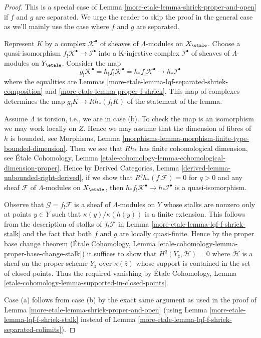 \begin{proof}
This is a special case of Lemma \ref{more-etale-lemma-shriek-proper-and-open}
if $f$ and $g$ are separated. We urge the reader to skip the proof
in the general case
as we'll mainly use the case where $f$ and $g$ are separated.

\medskip\noindent
Represent $K$ by a complex $\mathcal{K}^\bullet$ of sheaves of
$\Lambda$-modules on $X_\etale$. Choose a quasi-isomorphism
$f_!\mathcal{K}^\bullet \to \mathcal{I}^\bullet$ into a K-injective
complex $\mathcal{I}^\bullet$ of sheaves of $\Lambda$-modules on $Y_\etale$.
Consider the map
$$
g_!\mathcal{K}^\bullet =
h_!f_!\mathcal{K}^\bullet =
h_*f_!\mathcal{K}^\bullet
\longrightarrow
h_*\mathcal{I}^\bullet
$$
where the equalities are
Lemmas \ref{more-etale-lemma-lqf-separated-shriek-composition}
and \ref{more-etale-lemma-proper-f-shriek}. This map of complexes determines the map
$g_!K \to Rh_*(f_!K)$ of the statement of the lemma.

\medskip\noindent
Assume $\Lambda$ is torsion, i.e., we are in case (b). To check the map
is an isomorphism we may work locally on $Z$.
Hence we may assume that the dimension of fibres of $h$ is bounded,
see Morphisms, Lemma
\ref{morphisms-lemma-morphism-finite-type-bounded-dimension}.
Then we see that $Rh_*$ has finite cohomological dimension, see
\'Etale Cohomology, Lemma
\ref{etale-cohomology-lemma-cohomological-dimension-proper}.
Hence by Derived Categories, Lemma \ref{derived-lemma-unbounded-right-derived},
if we show that $R^qh_*(f_!\mathcal{F}) = 0$ for $q > 0$
and any sheaf $\mathcal{F}$ of $\Lambda$-modules on $X_\etale$, then
$h_*f_!\mathcal{K}^\bullet \to h_*\mathcal{I}^\bullet$ is a quasi-isomorphism.

\medskip\noindent
Observe that $\mathcal{G} = f_!\mathcal{F}$ is a sheaf of $\Lambda$-modules
on $Y$ whose stalks are nonzero only at points $y \in Y$ such that
$\kappa(y)/\kappa(h(y))$ is a finite extension. This follows from the
description of stalks of $f_!\mathcal{F}$ in
Lemma \ref{more-etale-lemma-lqf-f-shriek-stalk}
and the fact that both $f$ and $g$ are locally quasi-finite.
Hence by the proper base change theorem (\'Etale Cohomology, Lemma
\ref{etale-cohomology-lemma-proper-base-change-stalk})
it suffices to show that $H^q(Y_{\overline{z}}, \mathcal{H}) = 0$
where $\mathcal{H}$ is a sheaf on the proper scheme $Y_{\overline{z}}$
over $\kappa(\overline{z})$ whose support is contained in the set
of closed points. Thus the required vanishing by \'Etale Cohomology, Lemma
\ref{etale-cohomology-lemma-supported-in-closed-points}.

\medskip\noindent
Case (a) follows from case (b) by the exact same argument as used
in the proof of Lemma \ref{more-etale-lemma-shriek-proper-and-open}
(using Lemma \ref{more-etale-lemma-lqf-f-shriek-stalk} instead of
Lemma \ref{more-etale-lemma-lqf-f-shriek-separated-colimits}).
\end{proof}

